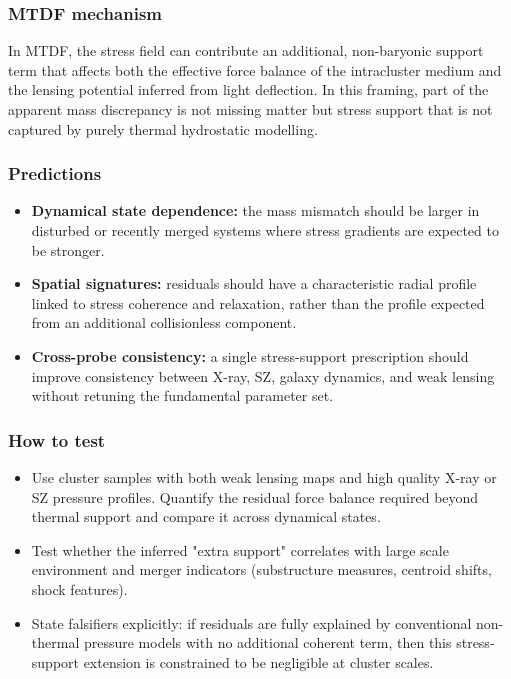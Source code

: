 \documentclass[11pt,a4paper]{article}
\begin{document}
\subsubsection{MTDF mechanism}
In MTDF, the stress field can contribute an additional, non-baryonic support term that affects both the effective force balance of the intracluster medium and
the lensing potential inferred from light deflection. In this framing, part of the apparent mass discrepancy is not missing matter but stress support that is not
captured by purely thermal hydrostatic modelling.

\subsubsection{Predictions}
\begin{itemize}
  \item \textbf{Dynamical state dependence:} the mass mismatch should be larger in disturbed or recently merged systems where stress gradients are expected to be stronger.
  \item \textbf{Spatial signatures:} residuals should have a characteristic radial profile linked to stress coherence and relaxation, rather than the profile expected from an additional collisionless component.
  \item \textbf{Cross-probe consistency:} a single stress-support prescription should improve consistency between X-ray, SZ, galaxy dynamics, and weak lensing without retuning the fundamental parameter set.
\end{itemize}

\subsubsection{How to test}
\begin{itemize}
  \item Use cluster samples with both weak lensing maps and high quality X-ray or SZ pressure profiles. Quantify the residual force balance required beyond thermal support and compare it across dynamical states.
  \item Test whether the inferred "extra support" correlates with large scale environment and merger indicators (substructure measures, centroid shifts, shock features).
  \item State falsifiers explicitly: if residuals are fully explained by conventional non-thermal pressure models with no additional coherent term, then this stress-support extension is constrained to be negligible at cluster scales.
\end{itemize}
\end{document}

